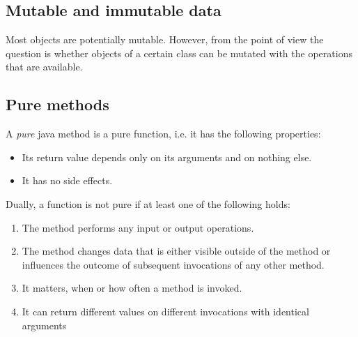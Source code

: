 \begin{figure*}[bth]
\begin{footnotesize}




\end{footnotesize}
\end{figure*}



\subsection{Mutable and immutable \java{} data}

Most \java{} objects are potentially mutable. 
However, from the \frege{} point of view the question is whether objects of a certain class can be mutated with the operations that are available.

\subsection{Pure \java{} methods} \label{pure}

A \emph{pure} java method is a pure function, i.e. it has the following properties:
\begin{itemize}
\item Its return value depends only on its arguments and on nothing else.
\item It has no side effects.
\end{itemize}

Dually, a function is not pure if at least one of the following holds:
\begin{enumerate}
\item The method performs any input or output operations.
\item The method changes data that is either visible outside of the method or influences the outcome of subsequent invocations of any other method.
\item It matters, when or how often a method is invoked.
\item It can return different values on different invocations with identical arguments
\end{enumerate}

